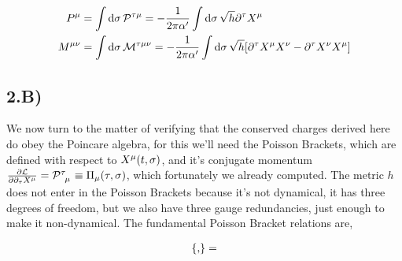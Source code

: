 \begin{align*}
    P^\mu&=\int\dd{\sigma}\mathcal P^{\tau\mu}=-\frac{1}{2\pi\alpha'}\int\dd{\sigma}\sqrt{h}\partial^\tau X^\mu\\
    M^{\mu\nu}&=\int\dd{\sigma}\mathcal M^{\tau\mu\nu}=-\frac{1}{2\pi\alpha'}\int\dd{\sigma}\sqrt{h}\qty[\partial^\tau X^\mu X^\nu-\partial^\tau X^\nu X^\mu]
\end{align*}

\subsection{2.B)}

We now turn to the matter of verifying that the conserved charges derived here do obey the Poincare algebra, for 
this we'll need the Poisson Brackets, which are defined with respect to $X^\mu\qty(t,\sigma)$, and it's conjugate 
momentum $\pdv{\mathcal L}{\partial_\tau X^\mu}=\tensor{{\mathcal P}}{^\tau_\mu}\equiv\Pi_\mu\qty(\tau,\sigma)$, which 
fortunately we already computed. The metric $h$ does not enter in the Poisson Brackets because it's not dynamical, 
it has three degrees of freedom, but we also have three gauge redundancies, just enough to make it non-dynamical. 
The fundamental Poisson Bracket relations are,

\begin{align*}
    \acomm{}{}=
\end{align*}